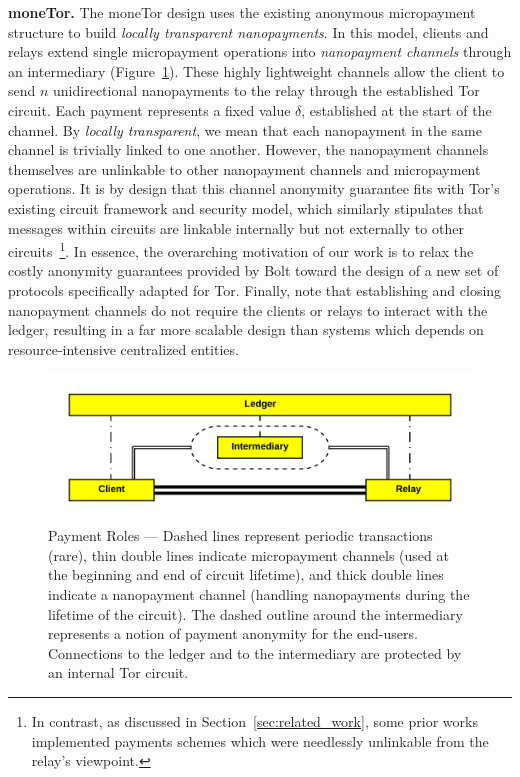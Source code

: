 \medskip \noindent\textbf{moneTor.} The moneTor design uses the existing anonymous micropayment structure to build \emph{locally transparent nanopayments}.
In this model, clients and relays extend single micropayment operations into \emph{nanopayment channels} through an intermediary (Figure~\ref{fig:parties}).
These highly lightweight channels allow the client to send $n$ unidirectional nanopayments to the relay through the established Tor circuit.
Each payment represents a fixed value $\delta$, established at the start of the channel.
By \emph{locally transparent}, we mean that each nanopayment in the same channel is trivially linked to one another.
However, the nanopayment channels themselves are unlinkable to other nanopayment channels and micropayment operations.
It is by design that this channel anonymity guarantee fits with Tor's existing circuit framework and security model, which similarly stipulates that messages within circuits are linkable internally but not externally to other circuits~\footnote{In contrast, as discussed in Section~\ref{sec:related_work}, some prior works implemented payments schemes which were needlessly unlinkable from the relay's viewpoint.}.
In essence, the overarching motivation of our work is to relax the costly anonymity guarantees provided by Bolt toward the design of a new set of protocols specifically adapted for Tor.
Finally, note that establishing and closing nanopayment channels do not require the clients or relays to interact with the ledger, resulting in a far more scalable design than systems which depends on resource-intensive centralized entities.

\begin{figure}[h] \centering
  \includegraphics[trim={0.5cm, 0.5cm, 0.5cm, 0.5cm}, clip,
    scale=0.6]{images/party_diagram.png}
  \caption[Payment Roles]{Payment Roles --- Dashed lines represent periodic transactions (rare), thin double lines indicate micropayment channels (used at the beginning and end of circuit lifetime), and thick double lines indicate a nanopayment channel (handling nanopayments during the lifetime of the circuit).
    The dashed outline around the intermediary represents a notion of payment anonymity for the end-users.
    Connections to the ledger and to the intermediary are protected by an internal Tor circuit.}
  \label{fig:parties}
\end{figure}

